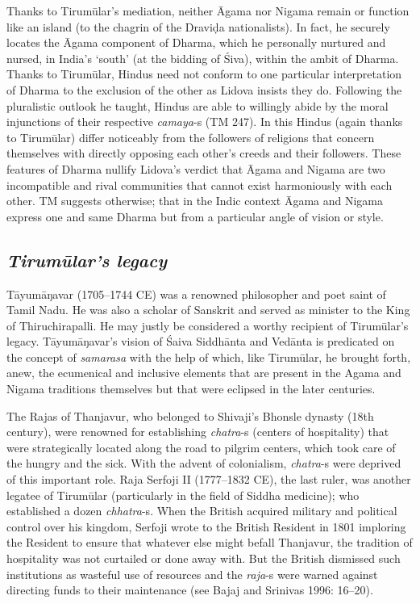 Thanks to Tirumūlar’s mediation, neither Āgama nor Nigama remain or function like an island (to the chagrin of the Draviḍa nationalists). In fact, he securely locates the Āgama component of Dharma, which he personally nurtured and nursed, in India’s ‘south’ (at the bidding of Śiva), within the ambit of Dharma. Thanks to Tirumūlar, Hindus need not conform to one particular interpretation of Dharma to the exclusion of the other as Lidova insists they do. Following the pluralistic outlook he taught, Hindus are able to willingly abide by the moral injunctions of their respective \textit{camaya}-s (TM 247). In this Hindus (again thanks to Tirumūlar) differ noticeably from the followers of religions that concern themselves with directly opposing each other’s creeds and their followers. These features of Dharma nullify Lidova’s verdict that Āgama and Nigama are two incompatible and rival communities that cannot exist harmoniously with each other. TM suggests otherwise; that in the Indic context Āgama and Nigama express one and same Dharma but from a particular angle of vision or style.


\subsection*{\textit{Tirumūlar’s legacy}}

Tāyumāŋavar (1705–1744 CE) was a renowned philosopher and poet saint of Tamil Nadu. He was also a scholar of Sanskrit and served as minister to the King of Thiruchirapalli. He may justly be considered a worthy recipient of Tirumūlar’s legacy. Tāyumāŋavar's vision of Śaiva Siddhānta and Vedānta is predicated on the concept of \textit{samarasa} with the help of which, like Tirumūlar, he brought forth, anew, the ecumenical and inclusive elements that are present in the Agama and Nigama traditions themselves but that were eclipsed in the later centuries.

The Rajas of Thanjavur, who belonged to Shivaji’s Bhonsle dynasty (18th century), were renowned for establishing \textit{chatra}-s (centers of hospitality) that were strategically located along the road to pilgrim centers, which took care of the hungry and the sick. With the advent of colonialism, \textit{chatra}-s were deprived of this important role. Raja Serfoji II (1777–1832 CE), the last ruler, was another legatee of Tirumūlar (particularly in the field of Siddha medicine); who established a dozen \textit{chhatra}-s. When the British acquired military and political control over his kingdom, Serfoji wrote to the British Resident in 1801 imploring the Resident to ensure that whatever else might befall Thanjavur, the tradition of hospitality was not curtailed or done away with. But the British dismissed such institutions as wasteful use of resources and the \textit{raja}-s were warned against directing funds to their maintenance (see Bajaj and Srinivas 1996: 16–20).

